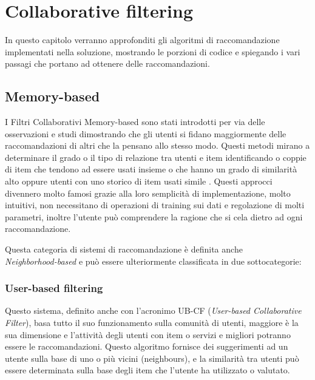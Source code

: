 \chapter{Collaborative filtering}
\label{chp:03-recommendationSystems}
In questo capitolo verranno approfonditi gli algoritmi di raccomandazione implementati nella soluzione, mostrando le porzioni di 
codice e spiegando i vari passagi che portano ad ottenere delle raccomandazioni.


\section{Memory-based} 
I Filtri Collaborativi Memory-based sono stati introdotti per via delle osservazioni e studi dimostrando che
gli utenti si fidano maggiormente delle raccomandazioni di altri che la pensano allo stesso modo. Questi metodi mirano a determinare 
il grado o il tipo di relazione tra utenti e item identificando o coppie di item che tendono ad essere usati insieme 
o che hanno un grado di similarità alto oppure utenti con uno storico di item usati simile
\cite{taxonomy-of-recommender-agents-on-the-internet}.
Questi approcci divennero molto famosi grazie alla loro semplicità di implementazione, molto intuitivi, non necessitano di operazioni
di training sui dati e regolazione di molti parametri, inoltre l'utente può comprendere la ragione che si cela dietro
ad ogni raccomandazione. 

Questa categoria di sistemi di raccomandazione è definita anche \\\textit{Neighborhood-based} e può essere ulteriormente 
classificata in due sottocategorie:


\subsection{User-based filtering} 
Questo sistema, definito anche con l'acronimo UB-CF (\textit{User-based Collaborative Filter}), basa tutto il suo funzionamento sulla 
comunità di utenti, maggiore è la sua dimensione e l'attività degli utenti con item o servizi e migliori potranno essere le 
raccomandazioni. Questo algoritmo fornisce dei suggerimenti ad un utente sulla base di uno o più vicini (neighbours), e la similarità 
tra utenti può essere determinata sulla base degli item che l'utente ha utilizzato o valutato.

